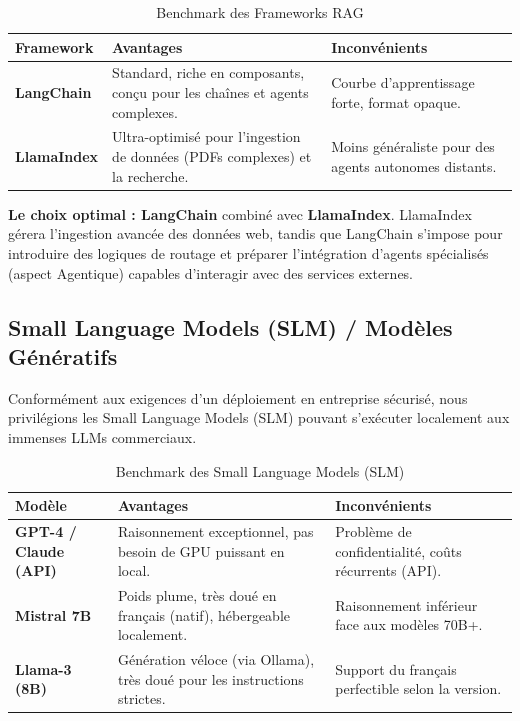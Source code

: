 \documentclass[12pt,a4paper]{article}
\begin{document}
\begin{table}[H]
    \centering
    \renewcommand{\arraystretch}{1.5}
    \begin{tabularx}{\textwidth}{|X|X|X|}
        \hline
        \textbf{Framework} & \textbf{Avantages} & \textbf{Inconvénients} \\
        \hline
        \textbf{LangChain} & Standard, riche en composants, conçu pour les chaînes et agents complexes. & Courbe d'apprentissage forte, format opaque. \\
        \hline
        \textbf{LlamaIndex} & Ultra-optimisé pour l'ingestion de données (PDFs complexes) et la recherche. & Moins généraliste pour des agents autonomes distants. \\
        \hline
    \end{tabularx}
    \caption{Benchmark des Frameworks RAG}
\end{table}

\textbf{Le choix optimal : LangChain} combiné avec \textbf{LlamaIndex}. LlamaIndex gérera l'ingestion avancée des données web, tandis que LangChain s'impose pour introduire des logiques de routage et préparer l'intégration d'agents spécialisés (aspect Agentique) capables d’interagir avec des services externes.

\subsection{Small Language Models (SLM) / Modèles Génératifs}
Conformément aux exigences d'un déploiement en entreprise sécurisé, nous privilégions les Small Language Models (SLM) pouvant s'exécuter localement aux immenses LLMs commerciaux.

\begin{table}[H]
    \centering
    \renewcommand{\arraystretch}{1.5}
    \begin{tabularx}{\textwidth}{|X|X|X|}
        \hline
        \textbf{Modèle} & \textbf{Avantages} & \textbf{Inconvénients} \\
        \hline
        \textbf{GPT-4 / Claude (API)} & Raisonnement exceptionnel, pas besoin de GPU puissant en local. & Problème de confidentialité, coûts récurrents (API). \\
        \hline
        \textbf{Mistral 7B} & Poids plume, très doué en français (natif), hébergeable localement. & Raisonnement inférieur face aux modèles 70B+. \\
        \hline
        \textbf{Llama-3 (8B)} & Génération véloce (via Ollama), très doué pour les instructions strictes. & Support du français perfectible selon la version. \\
        \hline
    \end{tabularx}
    \caption{Benchmark des Small Language Models (SLM)}
\end{table}
\end{document}
